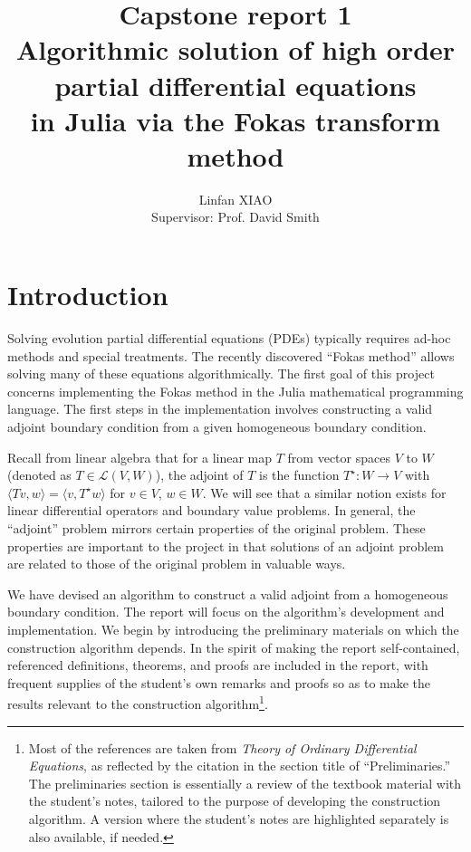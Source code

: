 \documentclass[11pt, oneside, a4paper]{article}
\author{Linfan XIAO\\
Supervisor: Prof. David Smith}
\title{Capstone report 1\\
Algorithmic solution of high order partial differential equations\\
in Julia via the Fokas transform method}
\date{\vspace{-5ex}}
\begin{document}
\maketitle

\thispagestyle{fancy}

\tableofcontents
\newpage
\section{Introduction}
Solving evolution partial differential equations (PDEs) typically requires ad-hoc methods and special treatments. The recently discovered ``Fokas method''\cite{Smith2016}\cite{Kesici2016} allows solving many of these equations algorithmically. The first goal of this project concerns implementing the Fokas method in the Julia mathematical programming language. The first steps in the implementation involves constructing a valid adjoint boundary condition from a given homogeneous boundary condition.

Recall from linear algebra that for a linear map $T$ from vector spaces $V$ to $W$ (denoted as $T\in\mathcal{L}(V,W)$), the adjoint of $T$ is the function $T^\star:W\to V$ with $\langle Tv, w\rangle = \langle v, T^\star w\rangle$ for $v\in V$, $w\in W$\cite{Axler1997}. We will see that a similar notion exists for linear differential operators and boundary value problems. In general, the ``adjoint'' problem mirrors certain properties of the original problem. These properties are important to the project in that solutions of an adjoint problem are related to those of the original problem in valuable ways.

We have devised an algorithm to construct a valid adjoint from a homogeneous boundary condition. The report will focus on the algorithm's development and implementation. We begin by introducing the preliminary materials on which the construction algorithm depends. In the spirit of making the report self-contained, referenced definitions, theorems, and proofs are included in the report, with frequent supplies of the student's own remarks and proofs so as to make the results relevant to the construction algorithm\footnote{Most of the references are taken from \textit{Theory of Ordinary Differential Equations}\cite{CoddingtonLevinson}, as reflected by the citation in the section title of ``Preliminaries.'' The preliminaries section is essentially a review of the textbook material with the student's notes, tailored to the purpose of developing the construction algorithm. A version where the student's notes are highlighted separately is also available, if needed.}. 
\end{document}
